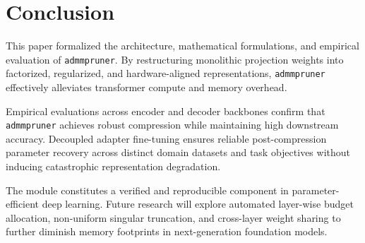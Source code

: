 \section{Conclusion}
This paper formalized the architecture, mathematical formulations, and empirical evaluation of \texttt{admmpruner}. By restructuring monolithic projection weights into factorized, regularized, and hardware-aligned representations, \texttt{admmpruner} effectively alleviates transformer compute and memory overhead.

Empirical evaluations across encoder and decoder backbones confirm that \texttt{admmpruner} achieves robust compression while maintaining high downstream accuracy. Decoupled adapter fine-tuning ensures reliable post-compression parameter recovery across distinct domain datasets and task objectives without inducing catastrophic representation degradation.

The module constitutes a verified and reproducible component in parameter-efficient deep learning. Future research will explore automated layer-wise budget allocation, non-uniform singular truncation, and cross-layer weight sharing to further diminish memory footprints in next-generation foundation models.

